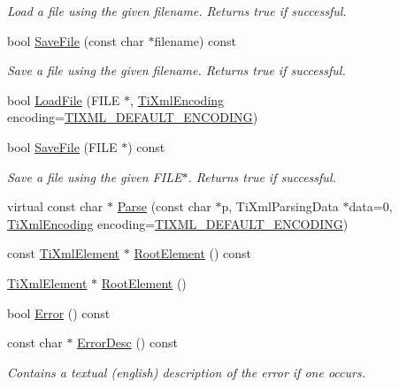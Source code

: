 \begin{DoxyCompactItemize}
\begin{DoxyCompactList}\small\item\em Load a file using the given filename. Returns true if successful. \end{DoxyCompactList}\item 
bool \hyperlink{class_ti_xml_document_ae869f5ebf7fc54c4a1d737fb4689fd44}{Save\+File} (const char $\ast$filename) const 
\begin{DoxyCompactList}\small\item\em Save a file using the given filename. Returns true if successful. \end{DoxyCompactList}\item 
bool \hyperlink{class_ti_xml_document_a41f6fe7200864d1dca663d230caf8db6}{Load\+File} (F\+I\+LE $\ast$, \hyperlink{tinyxml_8h_a88d51847a13ee0f4b4d320d03d2c4d96}{Ti\+Xml\+Encoding} encoding=\hyperlink{tinyxml_8h_ad5b8b092878e9010d6400cb6c13d4879}{T\+I\+X\+M\+L\+\_\+\+D\+E\+F\+A\+U\+L\+T\+\_\+\+E\+N\+C\+O\+D\+I\+NG})
\item 
bool \hyperlink{class_ti_xml_document_acf1672b4538c6d1d441f9f108aea2bf4}{Save\+File} (F\+I\+LE $\ast$) const 
\begin{DoxyCompactList}\small\item\em Save a file using the given F\+I\+L\+E$\ast$. Returns true if successful. \end{DoxyCompactList}\item 
virtual const char $\ast$ \hyperlink{class_ti_xml_document_a17ebabe36926ef398e78dec0d0ad0378}{Parse} (const char $\ast$p, Ti\+Xml\+Parsing\+Data $\ast$data=0, \hyperlink{tinyxml_8h_a88d51847a13ee0f4b4d320d03d2c4d96}{Ti\+Xml\+Encoding} encoding=\hyperlink{tinyxml_8h_ad5b8b092878e9010d6400cb6c13d4879}{T\+I\+X\+M\+L\+\_\+\+D\+E\+F\+A\+U\+L\+T\+\_\+\+E\+N\+C\+O\+D\+I\+NG})
\item 
const \hyperlink{class_ti_xml_element}{Ti\+Xml\+Element} $\ast$ \hyperlink{class_ti_xml_document_ad09d17927f908f40efb406af2fb873be}{Root\+Element} () const 
\item 
\hyperlink{class_ti_xml_element}{Ti\+Xml\+Element} $\ast$ \hyperlink{class_ti_xml_document_a0b43e762a23f938b06651bc90b8a1013}{Root\+Element} ()
\item 
bool \hyperlink{class_ti_xml_document_a6dfc01a6e5d58e56acd537dfd3bdeb29}{Error} () const 
\item 
const char $\ast$ \hyperlink{class_ti_xml_document_a9d0f689f6e09ea494ea547be8d79c25e}{Error\+Desc} () const 
\begin{DoxyCompactList}\small\item\em Contains a textual (english) description of the error if one occurs. \end{DoxyCompactList}\item 

\end{DoxyCompactItemize}
